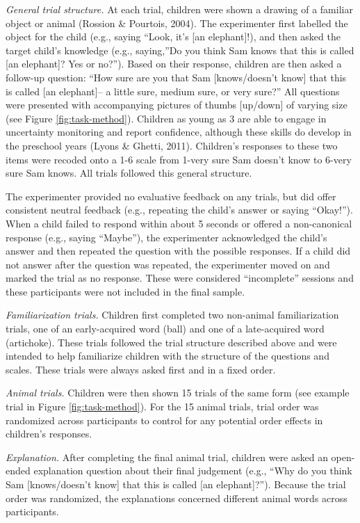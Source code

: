 \documentclass[10pt, letterpaper]{article}
\begin{document}
\emph{General trial structure.} At each trial, children were shown a
drawing of a familiar object or animal (Rossion \& Pourtois, 2004). The
experimenter first labelled the object for the child (e.g., saying
``Look, it's {[}an elephant{]}!), and then asked the target child's
knowledge (e.g., saying,''Do you think Sam knows that this is called
{[}an elephant{]}? Yes or no?''). Based on their response, children are
then asked a follow-up question: ``How sure are you that Sam
{[}knows/doesn't know{]} that this is called {[}an elephant{]}-- a
little sure, medium sure, or very sure?'' All questions were presented
with accompanying pictures of thumbs {[}up/down{]} of varying size (see
Figure \ref{fig:task-method}). Children as young as 3 are able to engage
in uncertainty monitoring and report confidence, although these skills
do develop in the preschool years (Lyons \& Ghetti, 2011). Children's
responses to these two items were recoded onto a 1-6 scale from 1-very
sure Sam doesn't know to 6-very sure Sam knows. All trials followed this
general structure.

The experimenter provided no evaluative feedback on any trials, but did
offer consistent neutral feedback (e.g., repeating the child's answer or
saying ``Okay!''). When a child failed to respond within about 5 seconds
or offered a non-canonical response (e.g., saying ``Maybe''), the
experimenter acknowledged the child's answer and then repeated the
question with the possible responses. If a child did not answer after
the question was repeated, the experimenter moved on and marked the
trial as no response. These were considered ``incomplete'' sessions and
these participants were not included in the final sample.

\emph{Familiarization trials.} Children first completed two non-animal
familiarization trials, one of an early-acquired word (ball) and one of
a late-acquired word (artichoke). These trials followed the trial
structure described above and were intended to help familiarize children
with the structure of the questions and scales. These trials were always
asked first and in a fixed order.

\emph{Animal trials.} Children were then shown 15 trials of the same
form (see example trial in Figure \ref{fig:task-method}). For the 15
animal trials, trial order was randomized across participants to control
for any potential order effects in children's responses.

\emph{Explanation.} After completing the final animal trial, children
were asked an open-ended explanation question about their final
judgement (e.g., ``Why do you think Sam {[}knows/doesn't know{]} that
this is called {[}an elephant{]}?''). Because the trial order was
randomized, the explanations concerned different animal words across
participants.
\end{document}
